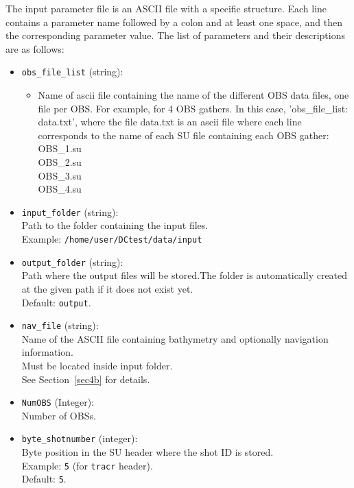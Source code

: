 \documentclass[11pt, oneside]{article}   	%
\begin{document}
The input parameter file is an ASCII file with a specific structure. Each line contains a parameter name followed by a colon and at least one space, and then the corresponding parameter value. The list of parameters and their descriptions are as follows:

\begin{itemize}

\item \texttt{obs\_file\_list} (string):
\begin{itemize}
\item Name of ascii file containing the name of the different OBS data files, one file per OBS. For example, for 4 OBS gathers. In this case, 'obs\_file\_list: data.txt', where the file data.txt is an ascii file where each line corresponds to the name of each SU file containing each OBS gather:\\
OBS\_1.su \\
OBS\_2.su \\
OBS\_3.su \\
OBS\_4.su 
\end{itemize}

\item \texttt{input\_folder} (string):\\
Path to the folder containing the input files.\\
Example: \texttt{/home/user/DCtest/data/input}

\item \texttt{output\_folder} (string):\\
Path where the output files will be stored.The folder is automatically created at the given path if it does not exist yet.\\
Default: \texttt{output}.

\item \texttt{nav\_file} (string):\\
Name of the ASCII file containing bathymetry and optionally navigation information.\\
Must be located inside input folder.\\
See Section~\ref{sec4b} for details.

\item \texttt{NumOBS} (Integer): \\
 Number of OBSs. \\

\item \texttt{byte\_shotnumber} (integer):\\
Byte position in the SU header where the shot ID is stored.\\
Example: \texttt{5} (for \texttt{tracr} header).\\
Default: \texttt{5}.


\end{itemize}
\end{document}
